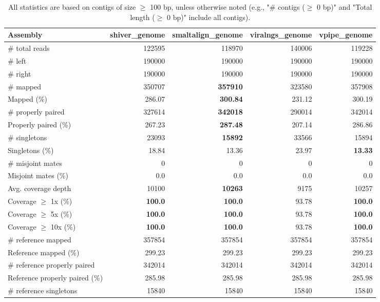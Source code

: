 \documentclass[12pt,a4paper]{article}
\begin{document}
\begin{table}[ht]
\begin{center}
\caption{All statistics are based on contigs of size $\geq$ 100 bp, unless otherwise noted (e.g., "\# contigs ($\geq$ 0 bp)" and "Total length ($\geq$ 0 bp)" include all contigs).}
\begin{tabular}{|l*{4}{|r}|}
\hline
Assembly & shiver\_genome & smaltalign\_genome & viralngs\_genome & vpipe\_genome \\ \hline
\# total reads & 122595 & 118970 & 140006 & 119228 \\ \hline
\# left & 190000 & 190000 & 190000 & 190000 \\ \hline
\# right & 190000 & 190000 & 190000 & 190000 \\ \hline
\# mapped & 350707 & {\bf 357910} & 323580 & 357908 \\ \hline
Mapped (\%) & 286.07 & {\bf 300.84} & 231.12 & 300.19 \\ \hline
\# properly paired & 327614 & {\bf 342018} & 290014 & 342014 \\ \hline
Properly paired (\%) & 267.23 & {\bf 287.48} & 207.14 & 286.86 \\ \hline
\# singletons & 23093 & {\bf 15892} & 33566 & 15894 \\ \hline
Singletons (\%) & 18.84 & 13.36 & 23.97 & {\bf 13.33} \\ \hline
\# misjoint mates & 0 & 0 & 0 & 0 \\ \hline
Misjoint mates (\%) & 0.0 & 0.0 & 0.0 & 0.0 \\ \hline
Avg. coverage depth & 10100 & {\bf 10263} & 9175 & 10257 \\ \hline
Coverage $\geq$ 1x (\%) & {\bf 100.0} & {\bf 100.0} & 93.78 & {\bf 100.0} \\ \hline
Coverage $\geq$ 5x (\%) & {\bf 100.0} & {\bf 100.0} & 93.78 & {\bf 100.0} \\ \hline
Coverage $\geq$ 10x (\%) & {\bf 100.0} & {\bf 100.0} & 93.78 & {\bf 100.0} \\ \hline
\# reference mapped & 357854 & 357854 & 357854 & 357854 \\ \hline
Reference mapped (\%) & 299.23 & 299.23 & 299.23 & 299.23 \\ \hline
\# reference properly paired & 342014 & 342014 & 342014 & 342014 \\ \hline
Reference properly paired (\%) & 285.98 & 285.98 & 285.98 & 285.98 \\ \hline
\# reference singletons & 15840 & 15840 & 15840 & 15840 \\ \hline

\end{tabular}
\end{center}
\end{table}
\end{document}
